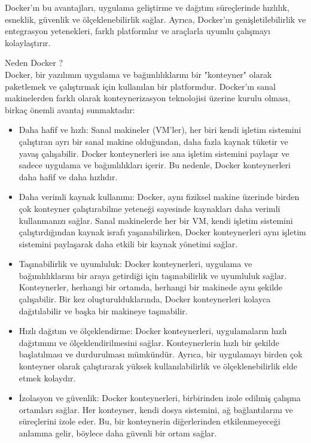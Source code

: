 Docker'ın bu avantajları, uygulama geliştirme ve dağıtım süreçlerinde hızlılık, esneklik, güvenlik ve ölçeklenebilirlik sağlar. Ayrıca, Docker'ın genişletilebilirlik ve entegrasyon yetenekleri, farklı platformlar ve araçlarla uyumlu çalışmayı kolaylaştırır.

Neden Docker ?\\
Docker, bir yazılımın uygulama ve bağımlılıklarını bir "konteyner" olarak paketlemek ve çalıştırmak için kullanılan bir platformdur. Docker'ın sanal makinelerden farklı olarak konteynerizasyon teknolojisi üzerine kurulu olması, birkaç önemli avantaj sunmaktadır:\\
\begin{itemize}
\item Daha hafif ve hızlı: Sanal makineler (VM'ler), her biri kendi işletim sistemini çalıştıran ayrı bir sanal makine olduğundan, daha fazla kaynak tüketir ve yavaş çalışabilir. Docker konteynerleri ise ana işletim sistemini paylaşır ve sadece uygulama ve bağımlılıkları içerir. Bu nedenle, Docker konteynerleri daha hafif ve daha hızlıdır.\\

\item Daha verimli kaynak kullanımı: Docker, aynı fiziksel makine üzerinde birden çok konteyner çalıştırabilme yeteneği sayesinde kaynakları daha verimli kullanmanızı sağlar. Sanal makinelerde her bir VM, kendi işletim sistemini çalıştırdığından kaynak israfı yaşanabilirken, Docker konteynerleri aynı işletim sistemini paylaşarak daha etkili bir kaynak yönetimi sağlar.\\

\item Taşınabilirlik ve uyumluluk: Docker konteynerleri, uygulama ve bağımlılıklarını bir araya getirdiği için taşınabilirlik ve uyumluluk sağlar. Konteynerler, herhangi bir ortamda, herhangi bir makinede aynı şekilde çalışabilir. Bir kez oluşturulduklarında, Docker konteynerleri kolayca dağıtılabilir ve başka bir makineye taşınabilir.\\

\item Hızlı dağıtım ve ölçeklendirme: Docker konteynerleri, uygulamaların hızlı dağıtımını ve ölçeklendirilmesini sağlar. Konteynerlerin hızlı bir şekilde başlatılması ve durdurulması mümkündür. Ayrıca, bir uygulamayı birden çok konteyner olarak çalıştırarak yüksek kullanılabilirlik ve ölçeklenebilirlik elde etmek kolaydır.\\

\item İzolasyon ve güvenlik: Docker konteynerleri, birbirinden izole edilmiş çalışma ortamları sağlar. Her konteyner, kendi dosya sistemini, ağ bağlantılarını ve süreçlerini izole eder. Bu, bir konteynerin diğerlerinden etkilenmeyeceği anlamına gelir, böylece daha güvenli bir ortam sağlar.\\
\end{itemize}

